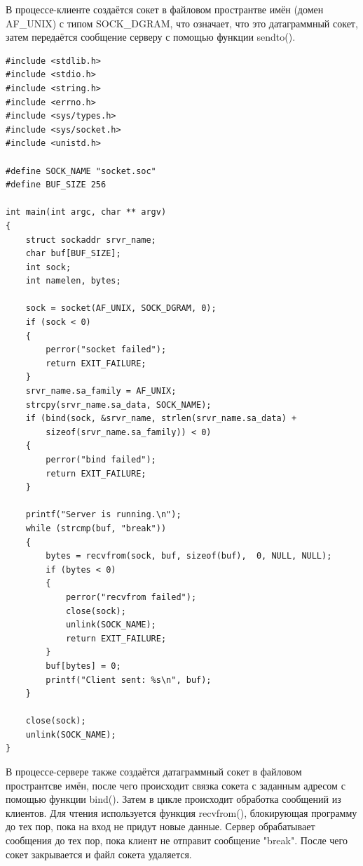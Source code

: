 В процессе-клиенте создаётся сокет в  файловом пространтве имён (домен AF\_UNIX) с типом SOCK\_DGRAM, что означает, что это датаграммный сокет, затем передаётся сообщение серверу с помощью функции sendto().

\lstset{language=c}
\begin{lstlisting}[caption=Текст программы сервера из первого задания]
#include <stdlib.h>
#include <stdio.h>
#include <string.h>
#include <errno.h>
#include <sys/types.h>
#include <sys/socket.h>
#include <unistd.h>

#define SOCK_NAME "socket.soc"
#define BUF_SIZE 256

int main(int argc, char ** argv)
{
    struct sockaddr srvr_name;
    char buf[BUF_SIZE];
    int sock;
    int namelen, bytes;

    sock = socket(AF_UNIX, SOCK_DGRAM, 0);
    if (sock < 0)
    {
        perror("socket failed");
        return EXIT_FAILURE;
    }
    srvr_name.sa_family = AF_UNIX;
    strcpy(srvr_name.sa_data, SOCK_NAME);
    if (bind(sock, &srvr_name, strlen(srvr_name.sa_data) +
        sizeof(srvr_name.sa_family)) < 0)
    {
        perror("bind failed");
        return EXIT_FAILURE;
    }

    printf("Server is running.\n");
    while (strcmp(buf, "break"))
    {
        bytes = recvfrom(sock, buf, sizeof(buf),  0, NULL, NULL);
        if (bytes < 0)
        {
            perror("recvfrom failed");
            close(sock);
            unlink(SOCK_NAME);
            return EXIT_FAILURE;
        }
        buf[bytes] = 0;
        printf("Client sent: %s\n", buf);
    }

    close(sock);
    unlink(SOCK_NAME);
}
\end{lstlisting}

В процессе-сервере также создаётся датаграммный сокет в файловом пространтсве имён, после чего происходит связка сокета с заданным адресом с помощью функции bind().
Затем в цикле происходит обработка сообщений из клиентов. Для чтения используется функция recvfrom(), блокирующая программу до тех пор, пока на вход не придут новые данные.
Сервер обрабатывает сообщения до тех пор, пока клиент не отправит сообщение "break". После чего сокет закрывается и файл сокета удаляется.

